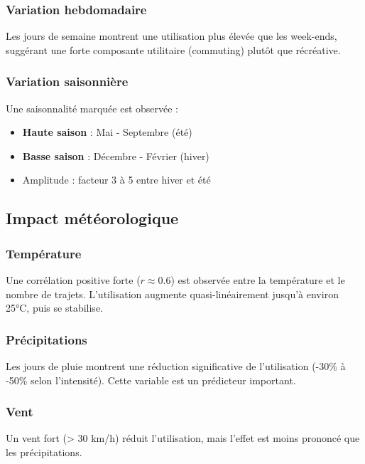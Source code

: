 \documentclass[12pt,a4paper]{article}
\begin{document}
\subsubsection{Variation hebdomadaire}

Les jours de semaine montrent une utilisation plus élevée que les week-ends, suggérant une forte composante utilitaire (commuting) plutôt que récréative.

\subsubsection{Variation saisonnière}

Une saisonnalité marquée est observée :
\begin{itemize}
    \item \textbf{Haute saison} : Mai - Septembre (été)
    \item \textbf{Basse saison} : Décembre - Février (hiver)
    \item Amplitude : facteur 3 à 5 entre hiver et été
\end{itemize}

\subsection{Impact météorologique}

\subsubsection{Température}

Une corrélation positive forte ($r \approx 0.6$) est observée entre la température et le nombre de trajets. L'utilisation augmente quasi-linéairement jusqu'à environ 25°C, puis se stabilise.

\subsubsection{Précipitations}

Les jours de pluie montrent une réduction significative de l'utilisation (-30\% à -50\% selon l'intensité). Cette variable est un prédicteur important.

\subsubsection{Vent}

Un vent fort (> 30 km/h) réduit l'utilisation, mais l'effet est moins prononcé que les précipitations.
\end{document}
